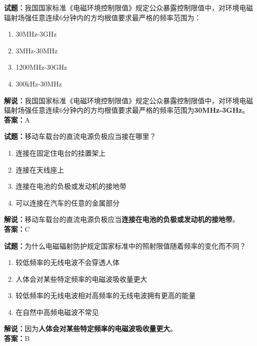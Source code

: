 \documentclass{ctexbook}
\begin{document}
\noindent\textbf{试题：}我国国家标准《电磁环境控制限值》规定公众暴露控制限值中，对环境电磁辐射场强任意连续6分钟内的方均根值要求最严格的频率范围为：
\begin{enumerate}[leftmargin=3em]
	\item 30\si{\MHz}-3\si{\GHz}
	\item 3\si{\MHz}-30\si{\MHz}
	\item 1200\si{\MHz}-30\si{\GHz}
	\item 300\si{\kHz}-30\si{\MHz}
\end{enumerate}
\noindent\textbf{解说：}我国国家标准《电磁环境控制限值》规定公众暴露控制限值中，对环境电磁辐射场强任意连续6分钟内的方均根值要求最严格的频率范围为\textbf{30\si{\MHz}-3\si{\GHz}}。\\
\textbf{答案：}A

\bigskip


\noindent\textbf{试题：}移动车载台的直流电源负极应当接在哪里？
\begin{enumerate}[leftmargin=3em]
	\item 连接在固定住电台的挂置架上
	\item 连接在天线座上
	\item 连接在电池的负极或发动机的接地带
	\item 可以连接在汽车的任意的金属部分
\end{enumerate}
\noindent\textbf{解说：}移动车载台的直流电源负极应当\textbf{连接在电池的负极或发动机的接地带}。\\
\textbf{答案：}C

\bigskip


\noindent\textbf{试题：}为什么电磁辐射防护规定国家标准中的照射限值随着频率的变化而不同？
\begin{enumerate}[leftmargin=3em]
	\item 较低频率的无线电波不会穿透人体
	\item 人体会对某些特定频率的电磁波吸收量更大
	\item 较低频率的无线电波相对高频率的无线电波拥有更高的能量
	\item 在自然中高频电磁波不常见
\end{enumerate}
\noindent\textbf{解说：}因为\textbf{人体会对某些特定频率的电磁波吸收量更大}。\\
\textbf{答案：}B










\end{document}
